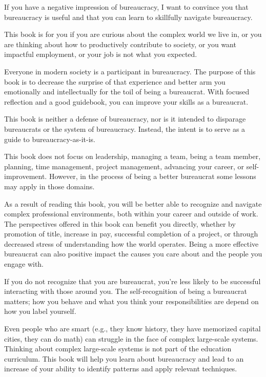 

If you have a negative impression of bureaucracy, I want to convince you that bureaucracy is useful and that you can learn to skillfully navigate bureaucracy.


This book is for you if you are curious about the complex world we live in, or you are thinking about how to productively contribute to society, or you want impactful employment, or your job is not what you expected. 


Everyone in modern society is a participant in bureaucracy. The purpose of this book is to decrease the surprise of that experience and better arm you emotionally and intellectually for the toil of being a bureaucrat. With focused reflection and a good guidebook, you can improve your skills as a bureaucrat. 

This book is neither a defense of bureaucracy, nor is it intended to disparage bureaucrats or the system of bureaucracy. Instead, the intent is to serve as a guide to bureaucracy-as-it-is. 

This book does not focus on leadership, managing a team, being a team member, planning, time management, project management, advancing your career, or self-improvement. However, in the process of being a better bureaucrat some lessons may apply in those domains.

As a result of reading this book, you will be better able to recognize and navigate complex professional environments, both within your career and outside of work. The perspectives offered in this book can benefit you directly, whether by promotion of title, increase in pay, successful completion of a project, or through decreased stress of understanding how the world operates. Being a more effective bureaucrat can also positive impact the causes you care about and the people you engage with.

If you do not recognize that you are bureaucrat, you're less likely to be successful interacting with those around you. The self-recognition of being a bureaucrat matters; how you behave and what you think your responsibilities are depend on how you label yourself.

Even people who are smart (e.g., they know history, they have memorized capital cities, they can do math) can struggle in the face of complex large-scale systems. Thinking about complex large-scale systems is not part of the education curriculum. This book will help you learn about bureaucracy and lead to an increase of your ability to identify patterns and apply relevant techniques.

